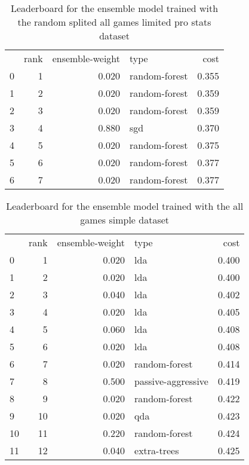 \begin{table}[]
	\centering
	\begin{tabular}{lrrlr}
		  & rank & ensemble-weight & type          & cost  \\
		0 & 1    & 0.020           & random-forest & 0.355 \\
		1 & 2    & 0.020           & random-forest & 0.359 \\
		2 & 3    & 0.020           & random-forest & 0.359 \\
		3 & 4    & 0.880           & sgd           & 0.370 \\
		4 & 5    & 0.020           & random-forest & 0.375 \\
		5 & 6    & 0.020           & random-forest & 0.377 \\
		6 & 7    & 0.020           & random-forest & 0.377 \\
	\end{tabular}

	\caption{Leaderboard for the ensemble model trained with the random splited all games limited pro stats dataset}
	\label{tab:lb-all-games-pro-only-spring-small-randsplit}
\end{table}

\begin{table}[]
	\centering
	\begin{tabular}{lrrlr}
		   & rank & ensemble-weight & type               & cost  \\
		0  & 1    & 0.020           & lda                & 0.400 \\
		1  & 2    & 0.020           & lda                & 0.400 \\
		2  & 3    & 0.040           & lda                & 0.402 \\
		3  & 4    & 0.020           & lda                & 0.405 \\
		4  & 5    & 0.060           & lda                & 0.408 \\
		5  & 6    & 0.020           & lda                & 0.408 \\
		6  & 7    & 0.020           & random-forest      & 0.414 \\
		7  & 8    & 0.500           & passive-aggressive & 0.419 \\
		8  & 9    & 0.020           & random-forest      & 0.422 \\
		9  & 10   & 0.020           & qda                & 0.423 \\
		10 & 11   & 0.220           & random-forest      & 0.424 \\
		11 & 12   & 0.040           & extra-trees        & 0.425 \\
	\end{tabular}

	\caption{Leaderboard for the ensemble model trained with the all games simple dataset}
	\label{tab:lb-all-games-simple-v2}
\end{table}

